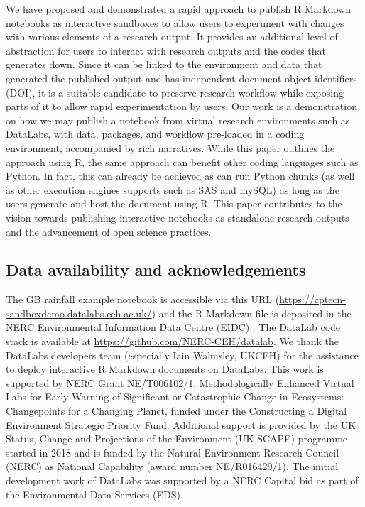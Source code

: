 We have proposed and demonstrated a rapid approach to publish R Markdown
notebooks as interactive sandboxes to allow users to experiment with
changes with various elements of a research output. It provides an
additional level of abstraction for users to interact with research
outputs and the codes that generates down. Since it can be linked to the
environment and data that generated the published output and has
independent document object identifiers (DOI), it is a suitable
candidate to preserve research workflow while exposing parts of it to
allow rapid experimentation by users. Our work is a demonstration on how
we may publish a notebook from virtual research environments such as
DataLabs, with data, packages, and workflow pre-loaded in a coding
environment, accompanied by rich narratives. While this paper outlines
the approach using R, the same approach can benefit other coding
languages such as Python. In fact, this can already be achieved as
 can run Python chunks (as well as other execution
engines  supports such as SAS and mySQL) as long as the
users generate and host the document using R. This paper contributes to
the vision towards publishing interactive notebooks as standalone
research outputs and the advancement of open science practices.

\hypertarget{data-availability-and-acknowledgements}{%
\subsection{Data availability and
acknowledgements}\label{data-availability-and-acknowledgments}}

The GB rainfall example notebook is accessible via this URL
(\url{https://cptecn-sandboxdemo.datalabs.ceh.ac.uk/}) and the R
Markdown file is deposited in the NERC Environmental Information Data
Centre (EIDC) \citep{EIDC}. The DataLab code stack is available at
\url{https://github.com/NERC-CEH/datalab}. We thank the DataLabs
developers team (especially Iain Walmsley, UKCEH) for the assistance to
deploy interactive R Markdown documents on DataLabs. This work is
supported by NERC Grant NE/T006102/1, Methodologically Enhanced Virtual
Labs for Early Warning of Significant or Catastrophic Change in
Ecosystems: Changepoints for a Changing Planet, funded under the
Constructing a Digital Environment Strategic Priority Fund. Additional
support is provided by the UK Status, Change and Projections of the
Environment (UK-SCAPE) programme started in 2018 and is funded by the
Natural Environment Research Council (NERC) as National Capability
(award number NE/R016429/1). The initial development work of DataLabs
was supported by a NERC Capital bid as part of the Environmental Data
Services (EDS).

